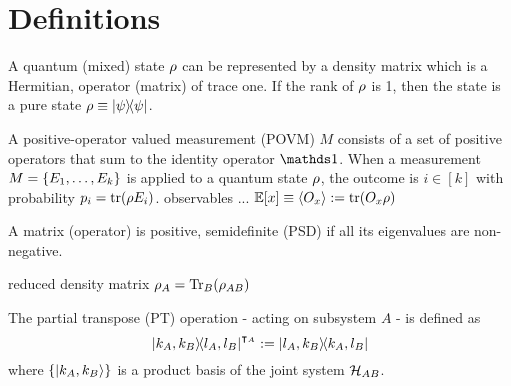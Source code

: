 
\newpage
\section{Definitions}\label{sec:definitions}
\begin{definition}\label{def:density_matrix}
	A quantum (mixed) state $\rho$ can be represented by a density matrix which is a Hermitian,  operator (matrix) of trace one. 
	If the rank of $\rho$ is 1, then the state is a pure state $\rho\equiv\op{\psi}$.
\end{definition}
\begin{definition}[POVM]\label{def:povm}
	A positive-operator valued measurement (POVM) $M$ consists of a set of positive operators that sum to the identity operator $\identity$. 
	When a measurement $M = \qty{ E_1 , \dots , E_k }$ is applied to a quantum state $\rho$, the outcome is $i \in [k]$ with probability $p_i = \tr( \rho E_i )$.
	observables ... $\mathbb{E}[x]\equiv\expval{O_x}:=\tr(O_x\rho)$
\end{definition}
\begin{definition}[PSD]\label{def:psd}
	A matrix (operator) is positive, semidefinite (PSD) if all its eigenvalues are non-negative.
\end{definition}
\begin{definition}\label{def:reduced_density_matrix}
	reduced density matrix $\rho_A = \Tr_B(\rho_{AB})$
\end{definition}
\begin{definition}\label{def:partial_transpose}
	\cite{horodeckiSeparabilityMixedStates1996}
	The partial transpose (PT) operation - acting on subsystem $A$ - is defined as
	\begin{equation}
		\op{k_A,k_B}{l_A,l_B}^{\intercal_A}
		:= \op{l_A,k_B}{k_A,l_B}
	\end{equation}
	where $\qty{\ket{k_A,k_B}}$ is a product basis of the joint system $\mathcal{H}_{AB}$.
\end{definition}
